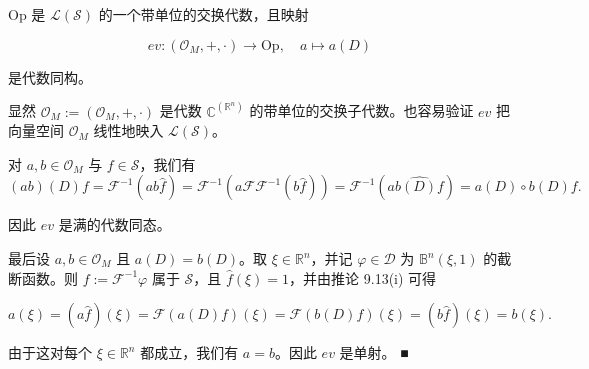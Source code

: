 \begin{proposition}

$ \mathrm{Op} $ 是 $ \mathcal{L}(\mathcal{S}) $ 的一个带单位的交换代数，且映射

\[
ev: (\mathcal{O}_M, +, \cdot) \to \mathrm{Op} , \quad a \mapsto a(D)
\]

是代数同构。

\proofhead
显然 $ \mathcal{O}_M := (\mathcal{O}_M, +, \cdot) $ 是代数 $ \mathbb{C}^{(\mathbb{R}^n)} $ 的带单位的交换子代数。也容易验证 $ ev $ 把向量空间 $ \mathcal{O}_M $ 线性地映入 $ \mathcal{L}(\mathcal{S}) $。

对 $ a, b \in \mathcal{O}_M $ 与 $ f \in \mathcal{S} $，我们有
\[
(ab)(D)f = \mathcal{F}^{-1}(ab\hat{f}) = \mathcal{F}^{-1}(a\mathcal{F}\mathcal{F}^{-1}(b\hat{f})) = \mathcal{F}^{-1}(a\widehat{b(D)f}) = a(D) \circ b(D)f .
\]

因此 $ ev $ 是满的代数同态。

最后设 $ a, b \in \mathcal{O}_M $ 且 $ a(D) = b(D) $。取 $ \xi \in \mathbb{R}^n $，并记 $ \varphi \in \mathcal{D} $ 为 $ \mathbb{B}^n(\xi,1) $ 的截断函数。则 $ f := \mathcal{F}^{-1}\varphi $ 属于 $ \mathcal{S} $，且 $ \hat{f}(\xi) = 1 $，并由推论 9.13(i) 可得

\[
a(\xi) = (a\hat{f})(\xi) = \mathcal{F}(a(D)f)(\xi) = \mathcal{F}(b(D)f)(\xi) = (b\hat{f})(\xi) = b(\xi) .
\]

由于这对每个 $ \xi \in \mathbb{R}^n $ 都成立，我们有 $ a = b $。因此 $ ev $ 是单射。 \nobreak\hspace{0.35em}■

\end{proposition}

